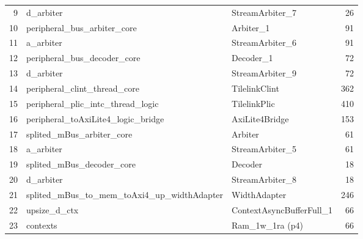 \begin{table}[!htbp]
\begin{tabular}{rllr}
9  & \quad\quad\quad d\_arbiter                                          & StreamArbiter\_7                                 &     26 \\
10 & \quad\quad peripheral\_bus\_arbiter\_core                           & Arbiter\_1                                       &     91 \\
11 & \quad\quad\quad a\_arbiter                                          & StreamArbiter\_6                                 &     91 \\
12 & \quad\quad peripheral\_bus\_decoder\_core                           & Decoder\_1                                       &     72 \\
13 & \quad\quad\quad d\_arbiter                                          & StreamArbiter\_9                                 &     72 \\
14 & \quad\quad peripheral\_clint\_thread\_core                          & TilelinkClint                                    &    362 \\
15 & \quad\quad peripheral\_plic\_intc\_thread\_logic                    & TilelinkPlic                                     &    410 \\
16 & \quad\quad peripheral\_toAxiLite4\_logic\_bridge                    & AxiLite4Bridge                                   &    153 \\
17 & \quad\quad splited\_mBus\_arbiter\_core                             & Arbiter                                          &     61 \\
18 & \quad\quad\quad a\_arbiter                                          & StreamArbiter\_5                                 &     61 \\
19 & \quad\quad splited\_mBus\_decoder\_core                             & Decoder                                          &     18 \\
20 & \quad\quad\quad d\_arbiter                                          & StreamArbiter\_8                                 &     18 \\
21 & \quad\quad splited\_mBus\_to\_mem\_toAxi4\_up\_widthAdapter         & WidthAdapter                                     &    246 \\
22 & \quad\quad\quad upsize\_d\_ctx                                      & ContextAsyncBufferFull\_1                        &     66 \\
23 & \quad\quad\quad\quad contexts                                       & Ram\_1w\_1ra (p4)                                &     66 \\

\end{tabular}
\end{table}
